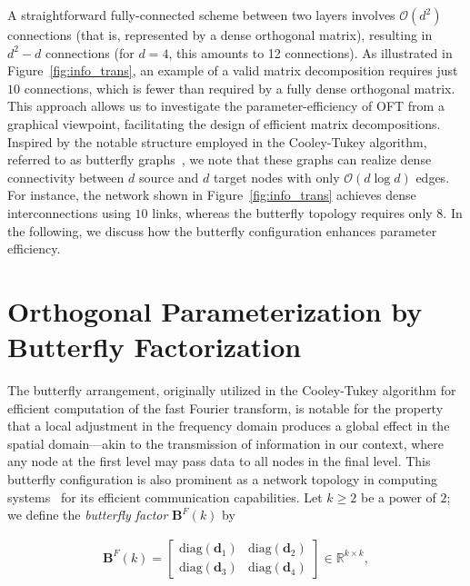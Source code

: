 A straightforward fully-connected scheme between two layers involves $\mathcal{O}(d^2)$ connections (that is, represented by a dense orthogonal matrix), resulting in $d^2-d$ connections (for $d=4$, this amounts to 12 connections). As illustrated in Figure~\ref{fig:info_trans}, an example of a valid matrix decomposition requires just $10$ connections, which is fewer than required by a fully dense orthogonal matrix. This approach allows us to investigate the parameter-efficiency of OFT from a graphical viewpoint, facilitating the design of efficient matrix decompositions. Inspired by the notable structure employed in the Cooley-Tukey algorithm, referred to as butterfly graphs~\cite{cooley1965algorithm}, we note that these graphs can realize dense connectivity between $d$ source and $d$ target nodes with only $\mathcal{O}(d\log d)$ edges. For instance, the network shown in Figure~\ref{fig:info_trans} achieves dense interconnections using $10$ links, whereas the butterfly topology requires only $8$. In the following, we discuss how the butterfly configuration enhances parameter efficiency.

\section{Orthogonal Parameterization by Butterfly Factorization}

The butterfly arrangement, originally utilized in the Cooley-Tukey algorithm for efficient computation of the fast Fourier transform, is notable for the property that a local adjustment in the frequency domain produces a global effect in the spatial domain—akin to the transmission of information in our context, where any node at the first level may pass data to all nodes in the final level. This butterfly configuration is also prominent as a network topology in computing systems~\cite{solihin2015fundamentals,li2011linear} for its efficient communication capabilities. Let $k\geq 2$ be a power of $2$; we define the \emph{butterfly factor} $\bm{B}^F(k)$ by

\begin{equation}\label{eq:but_factor}
\begin{aligned}
    \bm{B}^F(k)=\begin{bmatrix}
    \text{diag}(\bm{d}_1) & \text{diag}(\bm{d}_2) \\
    \text{diag}(\bm{d}_3) & \text{diag}(\bm{d}_4)
    \end{bmatrix}\in\mathbb{R}^{k\times k},
\end{aligned}
\end{equation}

